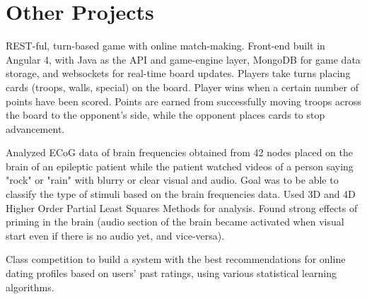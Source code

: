 \documentclass[letterpaper]{deedy-resume} %
\begin{document}
\begin{minipage}[t]{0.66\textwidth} %


\section{Other Projects}



REST-ful, turn-based game with online match-making. Front-end built in Angular 4, with Java as the API and game-engine layer, MongoDB for game data storage, and websockets for real-time board updates. Players take turns placing cards (troops, walls, special) on the board. Player wins when a certain number of points have been scored. Points are earned from successfully moving troops across the board to the opponent's side, while the opponent places cards to stop advancement. 

\sectionspace %



Analyzed ECoG data of brain frequencies obtained from 42 nodes placed on the brain of an epileptic patient while the patient watched videos of a person saying "rock" or "rain" with blurry or clear visual and audio. Goal was to be able to classify the type of stimuli based on the brain frequencies data. Used 3D and 4D Higher Order Partial Least Squares Methods for analysis. Found strong effects of priming in the brain (audio section of the brain became activated when visual start even if there is no audio yet, and vice-versa).

\sectionspace %


Class competition to build a system with the best recommendations for online dating profiles based on users' past ratings, using various statistical learning algorithms.


\end{minipage}
\end{document}
